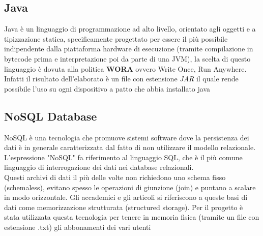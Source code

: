 \subsection{Java}
Java è un linguaggio di programmazione ad alto livello, orientato agli oggetti e a tipizzazione statica, specificamente progettato per essere il più possibile indipendente dalla piattaforma hardware di esecuzione (tramite compilazione in bytecode prima e interpretazione poi da parte di una JVM), la scelta di questo linguaggio è dovuta alla politica \textbf{WORA} ovvero Write Once, Run Anywhere. Infatti il risultato dell'elaborato è un file con estensione \textit{JAR} il quale rende possibile l'uso su ogni dispositivo a patto che abbia installato java
\subsection{NoSQL Database}
NoSQL è una tecnologia che promuove sistemi software dove la persistenza dei dati è in generale caratterizzata dal fatto di non utilizzare il modello relazionale. L'espressione "NoSQL" fa riferimento al linguaggio SQL, che è il più comune linguaggio di interrogazione dei dati nei database relazionali.
\\Questi archivi di dati il più delle volte non richiedono uno schema fisso (schemaless), evitano spesso le operazioni di giunzione (join) e puntano a scalare in modo orizzontale. Gli accademici e gli articoli si riferiscono a queste basi di dati come memorizzazione strutturata (structured storage). Per il progetto è stata utilizzata questa tecnologia per tenere in memoria fisica (tramite un file con estensione .txt) gli abbonamenti dei vari utenti